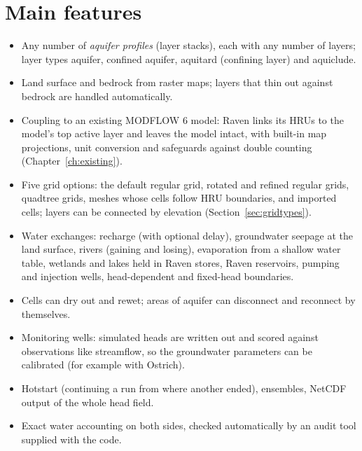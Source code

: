 \section{Main features}
\begin{itemize}
\item Any number of \emph{aquifer profiles} (layer stacks), each with any number of layers; layer types aquifer,
confined aquifer, aquitard (confining layer) and aquiclude.
\item Land surface and bedrock from raster maps; layers that thin out against bedrock are handled automatically.
\item Coupling to an existing MODFLOW 6 model: Raven links its HRUs to the model's top active layer and leaves the model
      intact, with built-in map projections, unit conversion and safeguards against double counting (Chapter~\ref{ch:existing}).
\item Five grid options: the default regular grid, rotated and refined regular grids, quadtree grids, meshes whose cells
      follow HRU boundaries, and imported cells; layers can be connected by elevation (Section~\ref{sec:gridtypes}).
\item Water exchanges: recharge (with optional delay), groundwater seepage at the land surface, rivers (gaining and
losing), evaporation from a shallow water table, wetlands and lakes held in Raven stores, Raven reservoirs, pumping and
injection wells, head-dependent and fixed-head boundaries.
\item Cells can dry out and rewet; areas of aquifer can disconnect and reconnect by themselves.
\item Monitoring wells: simulated heads are written out and scored against observations like streamflow, so the
groundwater parameters can be calibrated (for example with Ostrich).
\item Hotstart (continuing a run from where another ended), ensembles, NetCDF output of the whole head field.
\item Exact water accounting on both sides, checked automatically by an audit tool supplied with the code.
\end{itemize}

